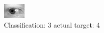 \begin{figure}[h!]
\begin{center}
\includegraphics[width=0.60\columnwidth]{figures/ID686_class_3_target_4.png}
\end{center}
\caption{ Classification: 3 actual target: 4}
\label{fig:ID686_class_3_target_4}
\end{figure}
